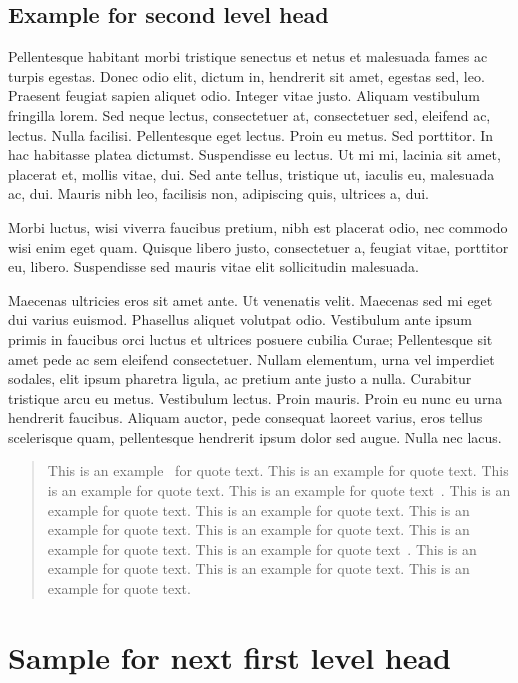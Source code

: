 \documentclass[APA,LATO1COL]{WileyNJD-v2}
\begin{document}
\subsection{Example for second level head}

Pellentesque habitant morbi tristique senectus et netus et malesuada fames ac turpis egestas. Donec odio elit, dictum
in, hendrerit sit amet, egestas sed, leo. Praesent feugiat sapien aliquet odio. Integer vitae justo. Aliquam vestibulum
fringilla lorem. Sed neque lectus, consectetuer at, consectetuer sed, eleifend ac, lectus. Nulla facilisi. Pellentesque
eget lectus. Proin eu metus. Sed porttitor. In hac habitasse platea dictumst. Suspendisse eu lectus. Ut mi mi, lacinia
sit amet, placerat et, mollis vitae, dui. Sed ante tellus, tristique ut, iaculis eu, malesuada ac, dui. Mauris nibh leo,
facilisis non, adipiscing quis, ultrices a, dui.

Morbi luctus, wisi viverra faucibus pretium, nibh est placerat odio, nec commodo wisi enim eget quam. Quisque
libero justo, consectetuer a, feugiat vitae, porttitor eu, libero. Suspendisse sed mauris vitae elit sollicitudin malesuada.

Maecenas ultricies eros sit amet ante. Ut venenatis velit. Maecenas sed mi eget dui varius euismod. Phasellus aliquet
volutpat odio. Vestibulum ante ipsum primis in faucibus orci luctus et ultrices posuere cubilia Curae; Pellentesque sit
amet pede ac sem eleifend consectetuer. Nullam elementum, urna vel imperdiet sodales, elit ipsum pharetra ligula,
ac pretium ante justo a nulla. Curabitur tristique arcu eu metus. Vestibulum lectus. Proin mauris. Proin eu nunc eu
urna hendrerit faucibus. Aliquam auctor, pede consequat laoreet varius, eros tellus scelerisque quam, pellentesque
hendrerit ipsum dolor sed augue. Nulla nec lacus.

\begin{quote}
This is an example~\citep{Elbaum2002,Blanchard2015} for quote text. This is an example for quote text. This is an example for quote text. This is an example for quote text~\cite{Blanchard2015}. This is an example for quote text. This is an example for quote text. This is an example for quote text. This is an example for quote text. This is an example for quote text. This is an example for quote text~\cite{Blanchard2015}. This is an example for quote text. This is an example for quote text. This is an example for quote text. 
\end{quote}

\section{Sample for next first level head}\label{sec3}
\end{document}
